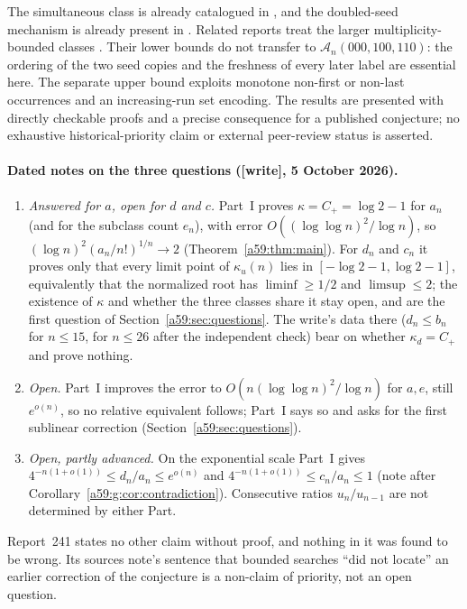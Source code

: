 \documentclass[11pt,letterpaper]{article}
\theoremstyle{remark}\newtheorem{remark}[theorem]{Remark}
\newcommand{\A}{\mathcal A}
\newcommand{\wtag}{\textup{[write]}}
\theoremstyle{remark}\newtheorem{wremark}{Remark}\renewcommand{\thewremark}{W\arabic{wremark}}
\theoremstyle{plain}\newtheorem{wcorollary}[wremark]{Corollary}
\begin{document}
The simultaneous class is already catalogued in \cite{callan}, and the doubled-seed mechanism is already present in \cite{conway}. Related reports treat the larger multiplicity-bounded classes \cite{MultiplicityReports}. Their lower bounds do not transfer to $\A_n(000,100,110)$: the ordering of the two seed copies and the freshness of every later label are essential here. The separate upper bound exploits monotone non-first or non-last occurrences and an increasing-run set encoding. The results are presented with directly checkable proofs and a precise consequence for a published conjecture; no exhaustive historical-priority claim or external peer-review status is asserted.

\paragraph{Dated notes on the three questions (\wtag, 5 October 2026).}
\begin{enumerate}
\item \emph{Answered for $a$, open for $d$ and $c$.} Part~I proves
$\kappa=C_+=\log2-1$ for $a_n$ (and for the subclass count $e_n$), with
error $O((\log\log n)^2/\log n)$, so $(\log n)^2(a_n/n!)^{1/n}\to2$
(Theorem~\ref{a59:thm:main}). For $d_n$ and $c_n$ it proves only that every
limit point of $\kappa_u(n)$ lies in $[-\log2-1,\log2-1]$, equivalently that
the normalized root has $\liminf\ge1/2$ and $\limsup\le2$; the existence
of $\kappa$ and whether the three classes share it stay open, and are the
first question of Section~\ref{a59:sec:questions}. The write's data there
($d_n\le b_n$ for $n\le15$, for $n\le26$ after the independent check) bear
on whether $\kappa_d=C_+$ and prove nothing.
\item \emph{Open.} Part~I improves the error to
$O(n(\log\log n)^2/\log n)$ for $a,e$, still $e^{o(n)}$, so no relative
equivalent follows; Part~I says so and asks for the first sublinear
correction (Section~\ref{a59:sec:questions}).
\item \emph{Open, partly advanced.} On the exponential scale Part~I gives
$4^{-n(1+o(1))}\le d_n/a_n\le e^{o(n)}$ and $4^{-n(1+o(1))}\le c_n/a_n\le1$
(note after Corollary~\ref{a59:g:cor:contradiction}). Consecutive ratios
$u_n/u_{n-1}$ are not determined by either Part.
\end{enumerate}
Report~241 states no other claim without proof, and nothing in it was found
to be wrong. Its sources note's sentence that bounded searches ``did not
locate'' an earlier correction of the conjecture is a non-claim of
priority, not an open question.
\end{document}
